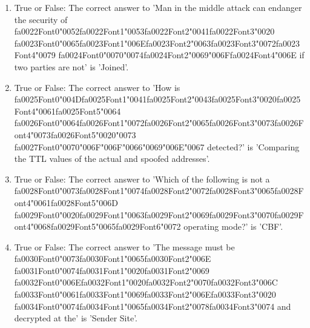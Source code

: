 \documentclass[12pt]{article}
\begin{document}
\begin{enumerate}[label=\arabic*.]
\item True or False: The correct answer to 'Man in the middle attack can endanger the security of {\csname fa0022Font0\endcsname\char"0052}{\csname fa0022Font1\endcsname\char"0053}{\csname fa0022Font2\endcsname\char"0041}{\csname fa0022Font3\endcsname\char"0020} {\csname fa0023Font0\endcsname\char"0065}{\csname fa0023Font1\endcsname\char"006E}{\csname fa0023Font2\endcsname\char"0063}{\csname fa0023Font3\endcsname\char"0072}{\csname fa0023Font4\endcsname\char"0079} {\csname fa0024Font0\endcsname\char"0070}{\char"0074}{\csname fa0024Font2\endcsname\char"0069}{\char"006F}{\csname fa0024Font4\endcsname\char"006E} if two parties are not' is 'Joined'.
\item True or False: The correct answer to 'How is {\csname fa0025Font0\endcsname\char"004D}{\csname fa0025Font1\endcsname\char"0041}{\csname fa0025Font2\endcsname\char"0043}{\csname fa0025Font3\endcsname\char"0020}{\csname fa0025Font4\endcsname\char"0061}{\csname fa0025Font5\endcsname\char"0064} {\csname fa0026Font0\endcsname\char"0064}{\csname fa0026Font1\endcsname\char"0072}{\csname fa0026Font2\endcsname\char"0065}{\csname fa0026Font3\endcsname\char"0073}{\csname fa0026Font4\endcsname\char"0073}{\csname fa0026Font5\endcsname\char"0020}{\char"0073} {\csname fa0027Font0\endcsname\char"0070}{\char"006F}{\char"006F}{\char"0066}{\char"0069}{\char"006E}{\char"0067} detected?' is 'Comparing the TTL values of the actual and spoofed addresses'.
\item True or False: The correct answer to 'Which of the following is not a {\csname fa0028Font0\endcsname\char"0073}{\csname fa0028Font1\endcsname\char"0074}{\csname fa0028Font2\endcsname\char"0072}{\csname fa0028Font3\endcsname\char"0065}{\csname fa0028Font4\endcsname\char"0061}{\csname fa0028Font5\endcsname\char"006D} {\csname fa0029Font0\endcsname\char"0020}{\csname fa0029Font1\endcsname\char"0063}{\csname fa0029Font2\endcsname\char"0069}{\csname fa0029Font3\endcsname\char"0070}{\csname fa0029Font4\endcsname\char"0068}{\csname fa0029Font5\endcsname\char"0065}{\csname fa0029Font6\endcsname\char"0072} operating mode?' is 'CBF'.
\item True or False: The correct answer to 'The message must be {\csname fa0030Font0\endcsname\char"0073}{\csname fa0030Font1\endcsname\char"0065}{\csname fa0030Font2\endcsname\char"006E} {\csname fa0031Font0\endcsname\char"0074}{\csname fa0031Font1\endcsname\char"0020}{\csname fa0031Font2\endcsname\char"0069} {\csname fa0032Font0\endcsname\char"006E}{\csname fa0032Font1\endcsname\char"0020}{\csname fa0032Font2\endcsname\char"0070}{\csname fa0032Font3\endcsname\char"006C} {\csname fa0033Font0\endcsname\char"0061}{\csname fa0033Font1\endcsname\char"0069}{\csname fa0033Font2\endcsname\char"006E}{\csname fa0033Font3\endcsname\char"0020} {\csname fa0034Font0\endcsname\char"0074}{\csname fa0034Font1\endcsname\char"0065}{\csname fa0034Font2\endcsname\char"0078}{\csname fa0034Font3\endcsname\char"0074} and decrypted at the' is 'Sender Site'.

\end{enumerate}
\end{document}
